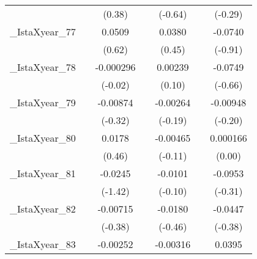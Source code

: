 {\begin{tabular}{l*{6}{c}}
            &                     &      (0.38)         &                     &     (-0.64)         &                     &     (-0.29)         \\
[1em]
\_IstaXyear\_77&                     &      0.0509         &                     &      0.0380         &                     &     -0.0740         \\
            &                     &      (0.62)         &                     &      (0.45)         &                     &     (-0.91)         \\
[1em]
\_IstaXyear\_78&                     &   -0.000296         &                     &     0.00239         &                     &     -0.0749         \\
            &                     &     (-0.02)         &                     &      (0.10)         &                     &     (-0.66)         \\
[1em]
\_IstaXyear\_79&                     &    -0.00874         &                     &    -0.00264         &                     &    -0.00948         \\
            &                     &     (-0.32)         &                     &     (-0.19)         &                     &     (-0.20)         \\
[1em]
\_IstaXyear\_80&                     &      0.0178         &                     &    -0.00465         &                     &    0.000166         \\
            &                     &      (0.46)         &                     &     (-0.11)         &                     &      (0.00)         \\
[1em]
\_IstaXyear\_81&                     &     -0.0245         &                     &     -0.0101         &                     &     -0.0953         \\
            &                     &     (-1.42)         &                     &     (-0.10)         &                     &     (-0.31)         \\
[1em]
\_IstaXyear\_82&                     &    -0.00715         &                     &     -0.0180         &                     &     -0.0447         \\
            &                     &     (-0.38)         &                     &     (-0.46)         &                     &     (-0.38)         \\
[1em]
\_IstaXyear\_83&                     &    -0.00252         &                     &    -0.00316         &                     &      0.0395         \\

\end{tabular}}
